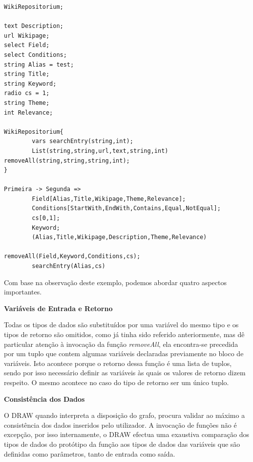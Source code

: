 \documentclass[a4paper]{article}
\begin{document}
\begin{small}
\begin{lstlisting}
WikiRepositorium;

text Description;
url Wikipage;
select Field;
select Conditions;
string Alias = test;
string Title;
string Keyword;
radio cs = 1;
string Theme;
int Relevance;

WikiRepositorium{
        vars searchEntry(string,int);
        List(string,string,url,text,string,int) removeAll(string,string,string,int);
}

Primeira -> Segunda =>
        Field[Alias,Title,Wikipage,Theme,Relevance];
        Conditions[StartWith,EndWith,Contains,Equal,NotEqual];
        cs[0,1];
        Keyword;
        (Alias,Title,Wikipage,Description,Theme,Relevance)
                                removeAll(Field,Keyword,Conditions,cs);
        searchEntry(Alias,cs)
\end{lstlisting}
\end{small}

\vspace{.2cm}

Com base na observação deste exemplo, podemos abordar quatro aspectos importantes.\\

\begin{small}
\textbf{Variáveis de Entrada e Retorno}\\
\end{small}

\hspace{1cm}Todas os tipos de dados são substituídos por uma variável do mesmo tipo e os tipos de retorno são omitidos, como já tinha
sido referido anteriormente, mas dê particular atenção à invocação da função \emph{removeAll}, ela encontra-se precedida por um tuplo
que contem algumas variáveis declaradas previamente no bloco de variáveis. Isto acontece porque o retorno dessa função é uma lista de
tuplos, sendo por isso necessário definir as variáveis às quais os valores de retorno dizem respeito. O mesmo acontece no caso do tipo de
retorno ser um único tuplo.\\

\begin{small}
\textbf{Consistência dos Dados}\\
\end{small}

\hspace{1cm}O DRAW quando interpreta a disposição do grafo, procura validar ao máximo a consistência dos dados inseridos pelo utilizador.
A invocação de funções não é excepção, por isso internamente, o DRAW efectua uma exaustiva comparação dos tipos de dados do protótipo da
função aos tipos de dados das variáveis que são definidas como parâmetros, tanto de entrada como saída.\\
\end{document}
